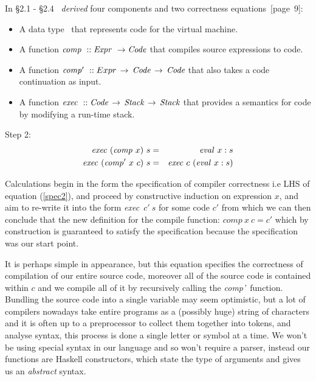 \documentclass {article}
\begin{document}
In \S2.1 - \S2.4 \BH\
\emph{derived} four 
components and two correctness equations\cite{bandh}~[page~9]:
\newcommand{\exec}{\textit{exec}}
\newcommand{\comp }{\textit{comp}}
\newcommand{\compp}{\textit{comp'}}
\newcommand{\Exec}{\mathit{exec\ }}
\newcommand{\Comp}{\mathit{comp\ }}
\newcommand{\Compp}{\mathit{comp'\  }}
\begin{itemize}
\item A data type \code\ that represents
	code for the virtual machine.
\item A function \( \Comp :: \Expr \rightarrow \code \)
	that compiles source expressions to code.
\item A function 
	\( \Compp::Expr \, \rightarrow \, \code \, \rightarrow \, \code \)
	that also takes a code continuation as input.
\item A function
	\( \Exec :: \code \, \rightarrow \, \textit{Stack} \, \rightarrow \, \textit{Stack} \)
	that provides a semantics for code by modifying a run-time stack.
\end{itemize}
Step 2:
\begin{eqnarray}
\Exec  (\Comp   x)\  s &=& \evalf x:s \label{spec1}\\
\Exec  (\Compp  x\  c)\ s &=& \Exec  c\  (\evalf x:s) \label{spec2}
\end{eqnarray}

Calculations begin in the form the 
specification of compiler correctness i.e LHS of equation (\ref{spec2}),
and proceed by constructive induction on expression $x$, 
and aim to re-write it into the form
\exec\  $c'\  s$ for some code $c'$
from which we can then conclude that the new definition
for the compile function: \( \Comp  x\  c = c' \) 
which by construction is guaranteed to satisfy
 the specification because 
the specification was our start point.

It is perhaps simple in appearance,
but this equation
specifies the correctness of compilation of our entire source code,
moreover all of the source code is contained within  $c$
and we compile all of it by recursively calling the \compp\ function.
Bundling the source code into a 
single variable may seem optimistic, but a lot of compilers nowadays 
take entire programs as a (possibly huge) string of characters
and it is often up to a preprocessor to collect 
them together into tokens, and analyse syntax, 
this process is done a single letter or symbol at a time\cite{dragon}.
We won't be using special syntax in our language and so won't
require a parser, instead our functions are  Haskell constructors, 
which state the type of arguments and gives us an \emph{abstract} syntax.
\end{document}
